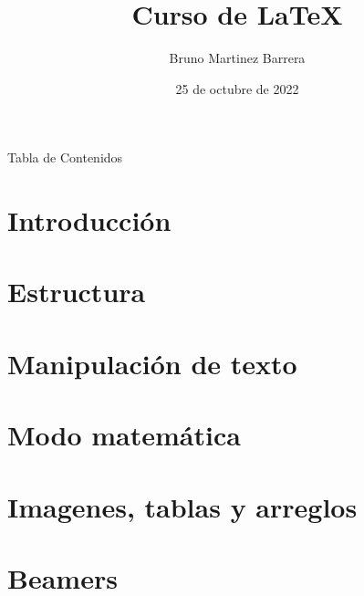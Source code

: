 \documentclass[10pt]{beamer}
\title{Curso de \LaTeX{}}
\author{Bruno Martinez Barrera}
\date{25 de octubre de 2022}
\begin{document}
    \begin{frame}
        \maketitle
    \end{frame}
    
    \begin{frame}{Tabla de Contenidos}
        \tableofcontents[hideallsubsections]
    \end{frame}
	
\section{Introducción}

    

\section{Estructura}

    
    
\section{Manipulación de texto}

    

\section{Modo matemática}

    
    
\section{Imagenes, tablas y arreglos}

    
    
\section{Beamers}

    
\end{document}
